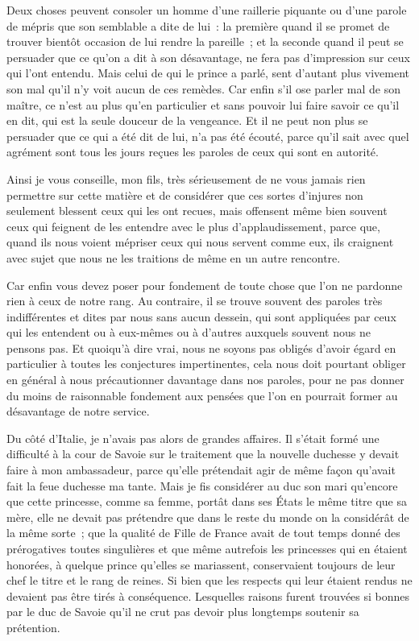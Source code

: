 \documentclass[french,twoside]{book} %
\begin{document}
Deux choses peuvent consoler un homme d’une raillerie piquante ou d’une parole de mépris que son semblable a dite de lui : la première quand il se promet de trouver bientôt occasion de lui rendre la pareille ; et la seconde quand il peut se persuader que ce qu’on a dit à son désavantage, ne fera pas d’impression sur ceux qui l’ont entendu. Mais celui de qui le prince a parlé, sent d’autant plus vivement son mal qu’il n’y voit aucun de ces remèdes. Car enfin s’il ose parler mal de son maître, ce n’est au plus qu’en particulier et sans pouvoir lui faire savoir ce qu’il en dit, qui est la seule douceur de la vengeance. Et il ne peut non plus se persuader que ce qui a été dit de lui, n’a pas été écouté, parce qu’il sait avec quel agrément sont tous les jours reçues les paroles de ceux qui sont en autorité.\par
Ainsi je vous conseille, mon fils, très sérieusement de ne vous jamais rien permettre sur cette matière et de considérer que ces sortes d’injures non seulement blessent ceux qui les ont recues, mais offensent même bien souvent ceux qui feignent de les entendre avec le plus d’applaudissement, parce que, quand ils nous voient mépriser ceux qui nous servent comme eux, ils craignent avec sujet que nous ne les traitions de même en un autre rencontre.\par
Car enfin vous devez poser pour fondement de toute chose que l’on ne pardonne rien à ceux de notre rang. Au contraire, il se trouve souvent des paroles très indifférentes et dites par nous sans aucun dessein, qui sont appliquées par ceux qui les entendent ou à eux-mêmes ou à d’autres auxquels souvent nous ne pensons pas. Et quoiqu’à dire vrai, nous ne soyons pas obligés d’avoir égard en particulier à toutes les conjectures impertinentes, cela nous doit pourtant obliger en général à nous précautionner davantage dans nos paroles, pour ne pas donner du moins de raisonnable fondement aux pensées que l’on en pourrait former au désavantage de notre service.\par
Du côté d’Italie, je n’avais pas alors de grandes affaires. Il s’était formé une difficulté à la cour de Savoie sur le traitement que la nouvelle duchesse y devait faire à mon ambassadeur, parce qu’elle prétendait agir de même façon qu’avait fait la feue duchesse ma tante. Mais je fis considérer au duc son mari qu’encore que cette princesse, comme sa femme, portât dans ses États le même titre que sa mère, elle ne devait pas prétendre que dans le reste du monde on la considérât de la même sorte ; que la qualité de Fille de France avait de tout temps donné des prérogatives toutes singulières et que même autrefois les princesses qui en étaient honorées, à quelque prince qu’elles se mariassent, conservaient toujours de leur chef le titre et le rang de reines. Si bien que les respects qui leur étaient rendus ne devaient pas être tirés à conséquence. Lesquelles raisons furent trouvées si bonnes par le duc de Savoie qu’il ne crut pas devoir plus longtemps soutenir sa prétention.\par
\end{document}
